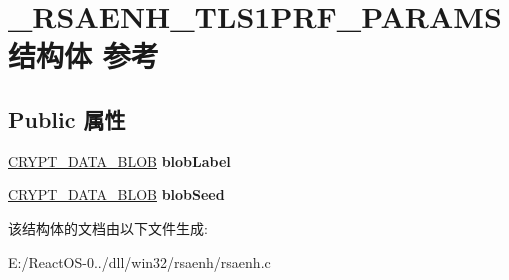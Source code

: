 \hypertarget{struct___r_s_a_e_n_h___t_l_s1_p_r_f___p_a_r_a_m_s}{}\section{\+\_\+\+R\+S\+A\+E\+N\+H\+\_\+\+T\+L\+S1\+P\+R\+F\+\_\+\+P\+A\+R\+A\+M\+S结构体 参考}
\label{struct___r_s_a_e_n_h___t_l_s1_p_r_f___p_a_r_a_m_s}
\subsection*{Public 属性}
\begin{DoxyCompactItemize}
\item 
\mbox{\label{struct___r_s_a_e_n_h___t_l_s1_p_r_f___p_a_r_a_m_s_a5d1c78c48ea0859ca89abc9bbdbcf099}} 
\hyperlink{struct___c_r_y_p_t_o_a_p_i___b_l_o_b}{C\+R\+Y\+P\+T\+\_\+\+D\+A\+T\+A\+\_\+\+B\+L\+OB} {\bfseries blob\+Label}
\item 
\mbox{\label{struct___r_s_a_e_n_h___t_l_s1_p_r_f___p_a_r_a_m_s_a5035caf93e859c17e3651e1bdadb7267}} 
\hyperlink{struct___c_r_y_p_t_o_a_p_i___b_l_o_b}{C\+R\+Y\+P\+T\+\_\+\+D\+A\+T\+A\+\_\+\+B\+L\+OB} {\bfseries blob\+Seed}
\end{DoxyCompactItemize}


该结构体的文档由以下文件生成\+:\begin{DoxyCompactItemize}
\item 
E\+:/\+React\+O\+S-\/0../dll/win32/rsaenh/rsaenh.\+c\end{DoxyCompactItemize}
